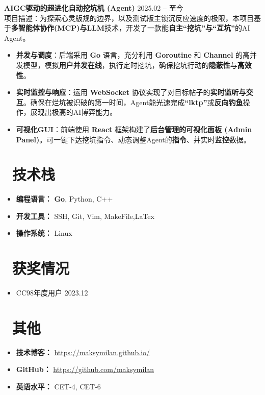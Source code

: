 \documentclass[11pt]{article}
\newlength{\interProjectSpacing}
\newcommand{\projectsep}{\vspace{\interProjectSpacing}}
\newlength{\intraProjectTitleSep}
\newcommand{\titlebreak}{\\[\intraProjectTitleSep]}
\newlength{\intraProjectListTopSep}
\begin{document}
\projectsep

\textbf{AIGC驱动的超进化自动挖坑机 (Agent)} \hfill 2025.02 -- 至今 \titlebreak
项目描述：为探索心灵版规的边界，以及测试版主锁沉反应速度的极限，本项目基于\textbf{多智能体协作(MCP)与LLM}技术，开发了一款能\textbf{自主“挖坑”与“互坑”}的AI Agent。
\begin{itemize}[nosep, topsep=\intraProjectListTopSep]
    \item \textbf{并发与调度}：后端采用 \textbf{Go} 语言，充分利用 \textbf{Goroutine} 和 \textbf{Channel} 的高并发模型，模拟\textbf{用户并发在线}，执行定时挖坑，确保挖坑行动的\textbf{隐蔽性}与\textbf{高效性}。
    \item \textbf{实时监控与响应}：运用 \textbf{WebSocket} 协议实现了对目标帖子的\textbf{实时监听与交互}。确保在烂坑被识破的第一时间，Agent能光速完成\textbf{“lktp”}或\textbf{反向钓鱼}操作，展现出极高的AI博弈能力。
    \item \textbf{可视化GUI}：前端使用 \textbf{React} 框架构建了\textbf{后台管理的可视化面板 (Admin Panel)}。可一键下达挖坑指令、动态调整Agent的\textbf{指令}、并实时监控数据。
\end{itemize}

\section{\makebox[\widthof{\faCogs}][c]{\color{CVBlue}\faCogs}\ 技术栈}
\begin{itemize}[nosep]
    \item \textbf{编程语言：} \textbf{Go}, Python, C++
    \item \textbf{开发工具：} SSH, Git, Vim, MakeFile,LaTex
    \item \textbf{操作系统：} Linux
\end{itemize}
\section{\makebox[\widthof{\faGraduationCap}][c]{\color{CVBlue}\faList}\ 获奖情况}
\begin{itemize}
    \item CC98年度用户 \hfill 2023.12
    
\end{itemize}
    
\section{\makebox[\widthof{\faInfo}][c]{\color{CVBlue}\faInfo}\ 其他}
\begin{itemize}[parsep=0.5ex]
    \item \textbf{技术博客：} \href{https://maksymilan.github.io/}{https://maksymilan.github.io/}
    \item \textbf{GitHub：} \href{https://github.com/maksymilan}{https://github.com/maksymilan} 
    \item \textbf{英语水平：} CET-4, CET-6
\end{itemize}
\end{document}
